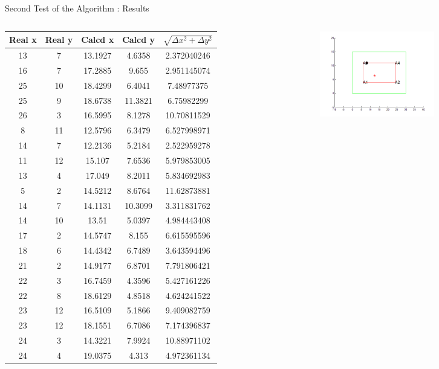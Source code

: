 \documentclass[utf8,compress]{beamer}
\begin{document}
\begin{frame}[containsverbatim]{Second Test of the Algorithm : Results  }
\begin{columns}
\begin{column}{0.5\textwidth}\tiny

\begin{tabular}{|c|c|c|c|c|}
\hline
	\textbf Real x & \textbf Real y & \textbf Calcd x & \textbf Calcd y & $\sqrt{\Delta x^2 + \Delta y^2} $ \\
\hline
\hline
13&	7&	13.1927&	4.6358&	2.372040246\\
16&	7&	17.2885&	9.655&	2.951145074\\
25&	10&	18.4299&	6.4041&	7.48977375\\
25&	9&	18.6738&	11.3821&	6.75982299\\
26&	3&	16.5995&	8.1278&	10.70811529\\
8&	11&	12.5796&	6.3479&	6.527998971\\
14&	7&	12.2136&	5.2184&	2.522959278\\
11&	12&	15.107&	7.6536&	5.979853005\\
13&	4&	17.049&	8.2011&	5.834692983\\
5&	2&	14.5212&	8.6764&	11.62873881\\
14&	7&	14.1131&	10.3099&	3.311831762\\
14&	10&	13.51&		5.0397&	4.984443408\\
17&	2&	14.5747&	8.155&	6.615595596\\
18&	6&	14.4342&	6.7489&	3.643594496\\
21&	2&	14.9177&	6.8701&	7.791806421\\
22&	3&	16.7459&	4.3596&	5.427161226\\
22&	8&	18.6129&	4.8518&	4.624241522\\
23&	12&	16.5109&	5.1866&	9.409082759\\
23&	12&	18.1551&	6.7086&	7.174396837\\
24&	3&	14.3221&	7.9924&	10.88971102\\
24&	4&	19.0375&	4.313&	4.972361134\\

\hline
\end{tabular}
\end{column}
\begin{column}{0.5\textwidth}
    \begin{figure}[h]
        \includegraphics[width=5cm]{t2rc_sur.png}
    \end{figure}
\end{column}

\end{columns}
\end{frame}
\end{document}
